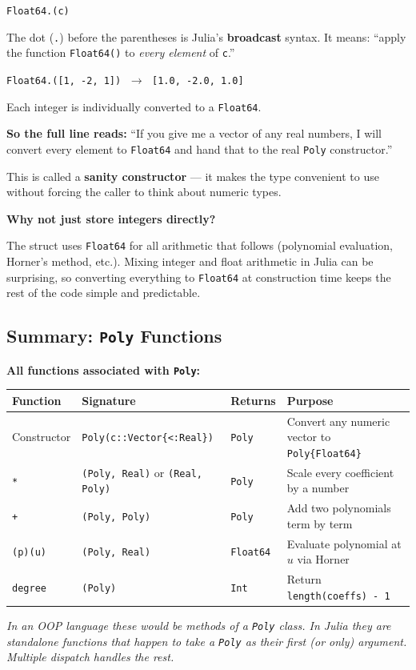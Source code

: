 \documentclass[12pt, a4paper]{article}
\newcommand{\cd}[1]{\texttt{#1}}
\begin{document}
\medskip
\cd{Float64.(c)}

The dot (\cd{.}) before the parentheses is Julia's
\textbf{broadcast} syntax.
It means: ``apply the function \cd{Float64()} to
\emph{every element} of \cd{c}.''

\begin{examplebox}
\cd{Float64.([1, -2, 1])}
$\;\to\;$
\cd{[1.0, -2.0, 1.0]}

Each integer is individually converted to a \cd{Float64}.
\end{examplebox}

\textbf{So the full line reads:}
``If you give me a vector of any real numbers, I will convert
every element to \cd{Float64} and hand that to the real \cd{Poly}
constructor.''

This is called a \textbf{sanity constructor} --- it makes the type
convenient to use without forcing the caller to think about
numeric types.

\begin{notebox}
\textbf{Why not just store integers directly?}

The struct uses \cd{Float64} for all arithmetic that follows
(polynomial evaluation, Horner's method, etc.).
Mixing integer and float arithmetic in Julia can be surprising,
so converting everything to \cd{Float64} at construction time
keeps the rest of the code simple and predictable.
\end{notebox}


\subsection*{Summary: \texttt{Poly} Functions}

\begin{notebox}
\textbf{All functions associated with \texttt{Poly}:}

\medskip
\begin{tabular}{lp{3.8cm}p{3.2cm}p{3.5cm}}
\toprule
Function & Signature & Returns & Purpose \\
\midrule
Constructor &
  \cd{Poly(c::Vector\{<:Real\})} &
  \cd{Poly} &
  Convert any numeric vector to \cd{Poly\{Float64\}} \\[4pt]
\cd{*} &
  \cd{(Poly, Real)} or \cd{(Real, Poly)} &
  \cd{Poly} &
  Scale every coefficient by a number \\[4pt]
\cd{+} &
  \cd{(Poly, Poly)} &
  \cd{Poly} &
  Add two polynomials term by term \\[4pt]
\cd{(p)(u)} &
  \cd{(Poly, Real)} &
  \cd{Float64} &
  Evaluate polynomial at $u$ via Horner \\[4pt]
\cd{degree} &
  \cd{(Poly)} &
  \cd{Int} &
  Return \cd{length(coeffs) - 1} \\
\bottomrule
\end{tabular}

\medskip
\textit{In an OOP language these would be methods of a \cd{Poly} class.
In Julia they are standalone functions that happen to take a \cd{Poly}
as their first (or only) argument.
Multiple dispatch handles the rest.}
\end{notebox}
\end{document}
